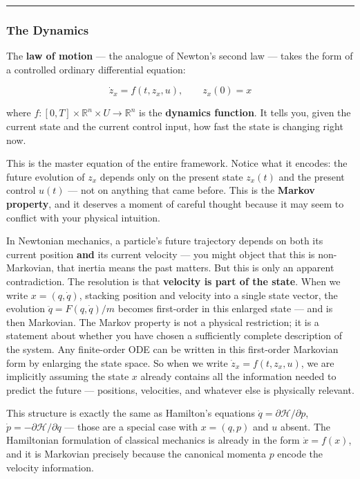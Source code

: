 \documentclass{article}
\begin{document}
\medskip\hrule\medskip

\subsubsection{The Dynamics}

The \textbf{law of motion} — the analogue of Newton's second law — takes the form of a controlled ordinary differential equation:

$$\dot{z}_x = f(t, z_x, u), \qquad z_x(0) = x$$

where $f : [0,T] \times \mathbb{R}^n \times U \to \mathbb{R}^n$ is the \textbf{dynamics function}. It tells you, given the current state and the current control input, how fast the state is changing right now.

This is the master equation of the entire framework. Notice what it encodes: the future evolution of $z_x$ depends only on the present state $z_x(t)$ and the present control $u(t)$ — not on anything that came before. This is the \textbf{Markov property}, and it deserves a moment of careful thought because it may seem to conflict with your physical intuition.

\begin{physicsinsightbox}
In Newtonian mechanics, a particle's future trajectory depends on both its current position \textbf{and} its current velocity — you might object that this is non-Markovian, that inertia means the past matters. But this is only an apparent contradiction. The resolution is that \textbf{velocity is part of the state}. When we write $x = (q, \dot{q})$, stacking position and velocity into a single state vector, the evolution $\ddot{q} = F(q, \dot{q})/m$ becomes first-order in this enlarged state — and is then Markovian. The Markov property is not a physical restriction; it is a statement about whether you have chosen a sufficiently complete description of the system. Any finite-order ODE can be written in this first-order Markovian form by enlarging the state space. So when we write $\dot{z}_x = f(t, z_x, u)$, we are implicitly assuming the state $x$ already contains all the information needed to predict the future — positions, velocities, and whatever else is physically relevant.

This structure is exactly the same as Hamilton's equations $\dot{q} = \partial \mathcal{H}/\partial p$, $\dot{p} = -\partial \mathcal{H}/\partial q$ — those are a special case with $x = (q,p)$ and $u$ absent. The Hamiltonian formulation of classical mechanics is already in the form $\dot{x} = f(x)$, and it is Markovian precisely because the canonical momenta $p$ encode the velocity information.
\end{physicsinsightbox}
\end{document}
